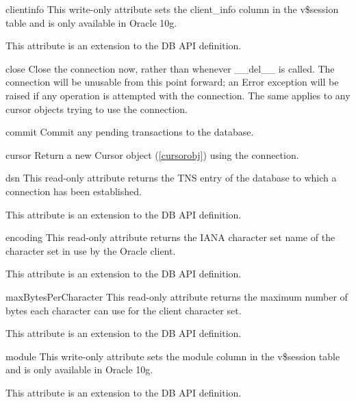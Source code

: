 \documentclass{manual}
\begin{document}
\begin{datadesc}{clientinfo}
  This write-only attribute sets the client_info column in the v\$session table
  and is only available in Oracle 10g.

   This attribute is an extension to the DB API definition.
\end{datadesc}

\begin{funcdesc}{close}{}
  Close the connection now, rather than whenever __del__ is called. The
  connection will be unusable from this point forward; an Error exception will
  be raised if any operation is attempted with the connection. The same applies
  to any cursor objects trying to use the connection.
\end{funcdesc}

\begin{funcdesc}{commit}{}
  Commit any pending transactions to the database.
\end{funcdesc}

\begin{funcdesc}{cursor}{}
  Return a new Cursor object (\ref{cursorobj}) using the connection.
\end{funcdesc}

\begin{datadesc}{dsn}
  This read-only attribute returns the TNS entry of the database to which a
  connection has been established.

   This attribute is an extension to the DB API definition.
\end{datadesc}

\begin{datadesc}{encoding}
  This read-only attribute returns the IANA character set name of the character
  set in use by the Oracle client.

   This attribute is an extension to the DB API definition.
\end{datadesc}

\begin{datadesc}{maxBytesPerCharacter}
  This read-only attribute returns the maximum number of bytes each character
  can use for the client character set.

   This attribute is an extension to the DB API definition.
\end{datadesc}

\begin{datadesc}{module}
  This write-only attribute sets the module column in the v\$session table and
  is only available in Oracle 10g.

   This attribute is an extension to the DB API definition.
\end{datadesc}
\end{document}
